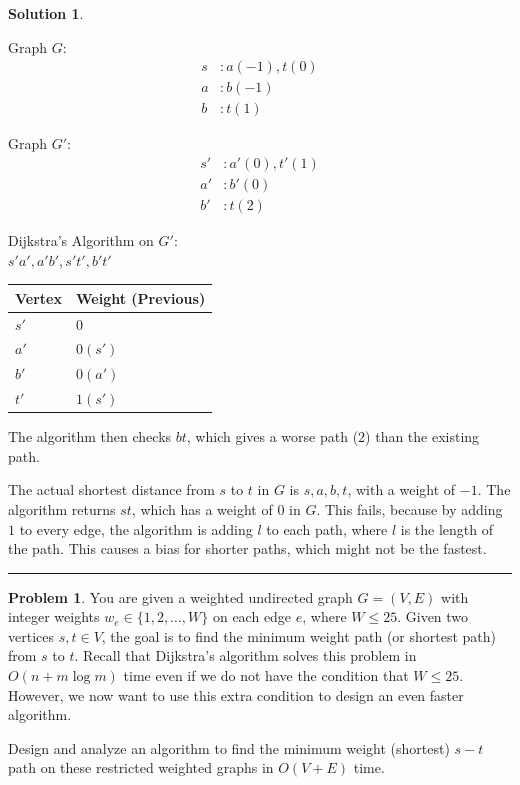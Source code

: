 \documentclass{article}
\theoremstyle{definition}
\newtheorem{problem}{Problem}
\def\fline{\rule{0.75\linewidth}{0.5pt}}
\newcommand{\finishline}{\begin{center}\fline\end{center}}
\newtheorem*{solution*}{Solution}
\newenvironment{solution}{\begin{solution*}}{{\finishline} \end{solution*}}
\begin{document}
\begin{solution}

\

Graph $G$:
\begin{align*}
s&: a (-1), t(0) \\
a&: b(-1) \\
b&: t(1)
\end{align*}

Graph $G'$:
\begin{align*}
s'&: a'(0), t'(1) \\
a'&: b'(0) \\
b'&: t(2)
\end{align*}

Dijkstra's Algorithm on $G'$: \\
$s'a', a'b', s't', b't'$

\begin{center}
\begin{tabular}{ll}
\toprule
Vertex & Weight (Previous) \\
\midrule
$s'$    & $0$               \\
$a'$    & $0 (s')$          \\
$b'$    & $0 (a')$          \\
$t'$    & $1 (s')$          \\
\bottomrule
\end{tabular}
\end{center}

The algorithm then checks $bt$, which gives a worse path ($2$) than the existing path.

The actual shortest distance from $s$ to $t$ in $G$ is $s,a,b,t$, with a weight of $-1$. The algorithm returns $st$, which has a weight of $0$ in $G$. This fails, because by adding $1$ to every edge, the algorithm is adding $l$ to each path, where $l$ is the length of the path. This causes a bias for shorter paths, which might not be the fastest.
\end{solution}

\newpage



\begin{problem}
You are given a weighted undirected graph $G=(V, E)$ with integer weights $w_e \in\{1,2, \ldots, W\}$ on each edge $e$, where $W \leq 25$. Given two vertices $s, t \in V$, the goal is to find the minimum weight path (or shortest path) from $s$ to $t$. Recall that Dijkstra's algorithm solves this problem in $O(n+m \log m)$ time even if we do not have the condition that $W \leq 25$. However, we now want to use this extra condition to design an even faster algorithm.

Design and analyze an algorithm to find the minimum weight (shortest) $s-t$ path on these restricted weighted graphs in $O(V+E)$ time.



\end{problem}
\end{document}
